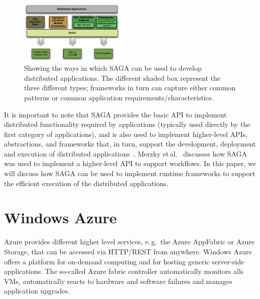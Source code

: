\documentclass[conference,final]{IEEEtran}
\newcommand{\up}{\vspace*{-1em}}
\begin{document}
\begin{figure}[!ht]
  \begin{center}
    \includegraphics[width=0.45\textwidth]{figures/distributed_applications_saga_figure.pdf}
  \end{center}
  \caption{\small Showing the ways in which SAGA can be used to
    develop distributed applications.  The different shaded box
    represent the three different types; frameworks in turn can
    capture either common patterns or common application
    requirements/characteristics. \label{Fig:sagaapps} \up}
\end{figure}

It is important to note that SAGA provides the basic API to implement
distributed functionality required by applications (typically used
directly by the first category of applications), and is also used to
implement higher-level APIs, abstractions, and frameworks that, in
turn, support the development, deployment and execution of distributed
applications~\cite{enkf-gmac09}. Merzky et\,al.~\cite{sagamontage09} 
discusses how SAGA was used to implement a higher-level API to support
workflows. In this paper, we will discuss how SAGA can be used to
implement runtime frameworks to support the efficient execution of the
distributed applications.

\section{Windows Azure}

Azure provides different higher level services, e.\,g.\ the Azure
AppFabric or Azure Storage, that can be accessed via HTTP/REST from
anywhere. Windows Azure offers a platform for on-demand computing and
for hosting generic server-side applications. The so-called Azure
fabric controller automatically monitors alls VMs, automatically
reacts to hardware and software failures and manages application
upgrades.
\end{document}
